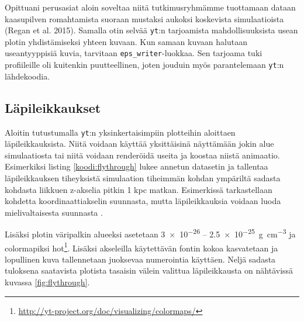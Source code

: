 \documentclass[12pt,a4paper]{article}
\newcommand{\yt}{\texttt{yt}}
\begin{document}
Opittuani perusasiat aloin soveltaa niitä tutkimusryhmämme tuottamaan dataan kaasupilven romahtamista suoraan mustaksi aukoksi koskevista simulaatioista (Regan et al. 2015). Samalla otin selvää \yt :n tarjoamista mahdollisuuksista usean plotin yhdistämiseksi yhteen kuvaan. Kun samaan kuvaan halutaan useantyyppisiä kuvia, tarvitaan \texttt{eps\_writer}-luokkaa. Sen tarjoama tuki profiileille oli kuitenkin puutteellinen, joten jouduin myös parantelemaan \yt :n lähdekoodia.

\subsection{Läpileikkaukset}
Aloitin tutustumalla \yt :n yksinkertaisimpiin plotteihin aloittaen läpileikkauksista. Niitä voidaan käyttää yksittäisinä näyttämään jokin alue simulaatiosta tai niitä voidaan renderöidä useita ja koostaa niistä animaatio. Esimerkiksi listing \ref{koodi:flythrough} lukee annetun datasetin ja tallentaa läpileikkauksen tiheyksistä simulaation tiheimmän kohdan ympäriltä sadasta kohdasta liikkuen z-akselia pitkin 1 kpc matkan. Esimerkissä tarkastellaan kohdetta koordinaattiakselin suunnasta, mutta läpileikkauksia voidaan luoda mielivaltaisesta suunnasta \cite{sliceproj}.

Lisäksi plotin väripalkin alueeksi asetetaan \SI{3e-26}{} -- \SI{2.5e-25}{\gram\per\cubic\centi\metre} ja colormapiksi hot\footnote{\url{http://yt-project.org/doc/visualizing/colormaps/}}. Lisäksi akseleilla käytettävän fontin kokoa kasvatetaan ja lopullinen kuva tallennetaan juoksevaa numerointia käyttäen. Neljä sadasta tuloksena saatavista plotista tasaisin välein valittua läpileikkausta on nähtävissä kuvassa \ref{fig:flythrough}.

\begin{minipage}{\linewidth}

\end{minipage}
\end{document}
